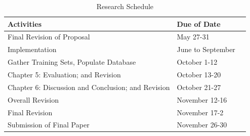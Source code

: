 \documentclass[12pt]{book}
\begin{document}
\begin{table}[ht]
\begin{center}
\begin{tabular}{|M{10cm}|M{5cm}|N}
 \hline
 \textbf{Activities} & \textbf{Due of Date}&\\[40pt]
 \hline
 Final Revision of Proposal & May 27-31 &\\[40pt]
 \hline
 Implementation & June to September&\\[40pt]
 \hline
 Gather Training Sets, Populate Database & October 1-12&\\[40pt]
 \hline
 Chapter 5: Evaluation; and Revision & October 13-20&\\[40pt]
 \hline
 Chapter 6: Discussion and Conclusion; and Revision & October 21-27&\\[40pt]
 \hline
 Overall Revision & November 12-16&\\[40pt]
 \hline
 Final Revision & November 17-2&\\[40pt]
 \hline
 Submission of Final Paper & November 26-30&\\[40pt]
 \hline
 
\end{tabular}
\end{center}
\caption{Research Schedule}
\end{table}

\clearpage
\pagebreak



\end{document}
